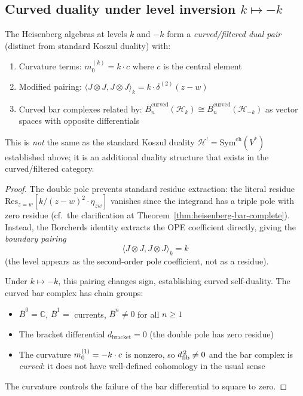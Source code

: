 \subsection{\texorpdfstring{Curved duality under level inversion $k \mapsto -k$}{Curved duality under level inversion k -k}}

\begin{theorem}\label{thm:heisenberg-level-inversion}
The Heisenberg algebras at levels $k$ and $-k$ form a \emph{curved/filtered dual pair} (distinct from standard Koszul duality) with:
\begin{enumerate}
\item Curvature terms: $m_0^{(k)} = k \cdot c$ where $c$ is the central element
\item Modified pairing: $\langle J \otimes J, J \otimes J \rangle_k = k \cdot \delta^{(2)}(z-w)$
\item Curved bar complexes related by: $\bar{B}^{\text{curved}}_n(\mathcal{H}_k) \cong \bar{B}^{\text{curved}}_n(\mathcal{H}_{-k})$ as vector spaces with opposite differentials
\end{enumerate}

This is \emph{not} the same as the standard Koszul duality $\mathcal{H}^! = \mathrm{Sym}^{\mathrm{ch}}(V^*)$ established above; it is an additional duality structure that exists in the curved/filtered category.
\end{theorem}

\begin{proof}
The double pole prevents standard residue extraction: the literal residue $\mathrm{Res}_{z=w}[k/(z-w)^2 \cdot \eta_{zw}]$ vanishes since the integrand has a triple pole with zero residue (cf.\ the clarification at Theorem~\ref{thm:heisenberg-bar-complete}).  Instead, the Borcherds identity extracts the OPE coefficient directly, giving the \emph{boundary pairing}
\[
\langle J \otimes J, J \otimes J \rangle_k = k
\]
(the level appears as the second-order pole coefficient, not as a residue).

Under $k \mapsto -k$, this pairing changes sign, establishing curved self-duality.  The curved bar complex has chain groups:
\begin{itemize}
\item $\bar{B}^0 = \mathbb{C}$, \quad $\bar{B}^1 = $ currents, \quad $\bar{B}^n \neq 0$ for all $n \geq 1$
\item The bracket differential $d_{\mathrm{bracket}} = 0$ (the double pole has zero residue)
\item The curvature $m_0^{(1)} = -k \cdot c$ is nonzero, so $d_{\mathrm{fib}}^{\,2} \neq 0$ and the bar complex is \emph{curved}: it does not have well-defined cohomology in the usual sense
\end{itemize}
The curvature controls the failure of the bar differential to square to zero.
\end{proof}

